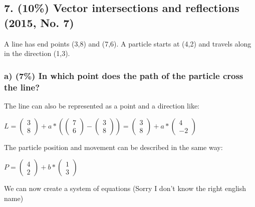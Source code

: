 \subsection{7. (10\%) Vector intersections and reflections (2015, No. 7)}
A line has end points (3,8) and (7,6). 
A particle starts at (4,2) and travels along in the direction (1,3). 

\subsubsection{a) (7\%) In which point does the path of the particle cross the line?}

The line can also be represented as a point and a direction like:

$
    L
=
    \left(\begin{array}{c}
        3\\
        8
    \end{array}\right)
    +
    a
    *
    \left(
        \left(\begin{array}{c}
            7\\
            6
        \end{array}\right)
        -
        \left(\begin{array}{c}
            3\\
            8
        \end{array}\right)
    \right)
=
    \left(\begin{array}{c}
        3\\
        8
    \end{array}\right)
    +
    a
    *
    \left(\begin{array}{c}
        4\\
        -2
    \end{array}\right)
$

The particle position and movement can be described in the same way:

$
    P
=
    \left(\begin{array}{c}
        4\\
        2
    \end{array}\right)
    +
    b
    *
    \left(\begin{array}{c}
        1\\
        3
    \end{array}\right)
$

We can now create a system of equations (Sorry I don't know the right
english name)

